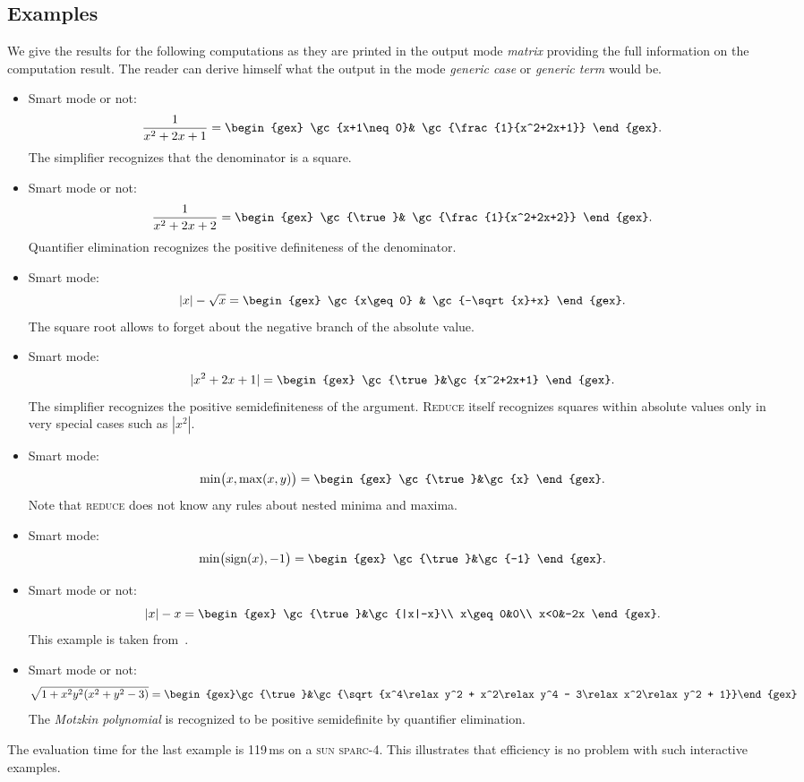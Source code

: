 \subsection{Examples}\label{examples}
We give the results for the following computations as they are printed
in the output mode {\em matrix} providing the full information on the
computation result. The reader can derive himself what the output in
the mode {\em generic case} or {\em generic term} would be.
\begin{itemize}
\item Smart mode or not:
$$
\frac{1}{x^2+2x+1}=\begin{gex}
\gc{x+1\neq0}& \gc{\frac{1}{x^2+2x+1}}
		   \end{gex}.
$$
The simplifier recognizes that the denominator is a square.
\item Smart mode or not:
$$
\frac{1}{x^2+2x+2}=\begin{gex}
\gc{\true}& \gc{\frac{1}{x^2+2x+2}}
		   \end{gex}.
$$
Quantifier elimination recognizes the positive definiteness of the
denominator.
\item Smart mode:
$$
|x|-\sqrt{x}=\begin{gex}
\gc{x\geq 0} & \gc{-\sqrt{x}+x}
	     \end{gex}.
$$
The square root allows to forget about the negative branch of the
absolute value.
\item Smart mode:
$$
|x^2+2x+1|=\begin{gex}
\gc{\true}&\gc{x^2+2x+1}
	   \end{gex}.
$$
The simplifier recognizes the positive semidefiniteness of
the argument. \textsc{Reduce} itself recognizes squares within absolute values
only in very special cases such as $|x^2|$.
\item Smart mode:
$$
\min\bigl(x,\max(x,y)\bigr)=\begin{gex}
\gc{\true}&\gc{x}
		  \end{gex}.
$$
Note that \textsc{reduce} does not know any rules about nested minima and
maxima.
\item
Smart mode:
$$
\min\bigl(\sign(x),-1\bigr)=\begin{gex}
\gc{\true}&\gc{-1}
		  \end{gex}.
$$
\item Smart mode or not:
$$
|x|-x=\begin{gex}
\gc{\true}&\gc{|x|-x}\\
x\geq0&0\\
x<0&-2x
      \end{gex}.
$$
This example is taken from~\cite{DavenportFaure:94}.
\item
Smart mode or not:
$$
\sqrt{1+x^2\relax y^2\relax
(x^2+y^2-3)}={}
\begin{gex}\gc{\true}&\gc{\sqrt{x^4\relax y^2 +
x^2\relax y^4 - 3\relax x^2\relax y^2 + 1}}\end{gex}
$$
The {\em Motzkin polynomial} is recognized to be positive semidefinite
by quantifier elimination.
\end{itemize}
The evaluation time for the last example is 119\,ms on a \textsc{sun
sparc-4}. This illustrates that efficiency is no problem with such
interactive examples.

